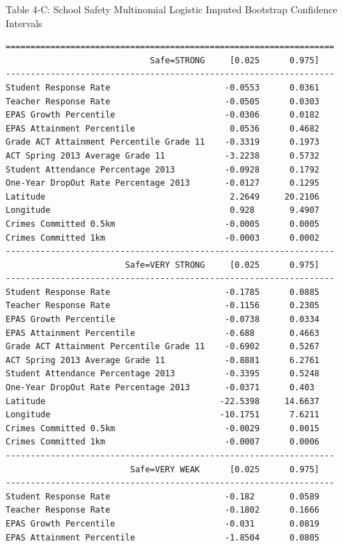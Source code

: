 \documentclass[11pt]{article}
\newcommand{\1}{\mathds{1}}
\begin{document}
\newpage
\noindent
Table 4-C: School Safety Multinomial Logistic Imputed Bootstrap Confidence Intervals
\begin{Verbatim}[fontsize=\tiny]
==================================================================
                             Safe=STRONG     [0.025      0.975]         
------------------------------------------------------------------
Student Response Rate                       -0.0553      0.0361     
Teacher Response Rate                       -0.0505      0.0303     
EPAS Growth Percentile                      -0.0306      0.0182
EPAS Attainment Percentile                   0.0536      0.4682
Grade ACT Attainment Percentile Grade 11    -0.3319      0.1973
ACT Spring 2013 Average Grade 11            -3.2238      0.5732
Student Attendance Percentage 2013          -0.0928      0.1792
One-Year DropOut Rate Percentage 2013       -0.0127      0.1295 
Latitude                                     2.2649     20.2106
Longitude                                    0.928       9.4907
Crimes Committed 0.5km                      -0.0005      0.0005
Crimes Committed 1km                        -0.0003      0.0002
------------------------------------------------------------------
                        Safe=VERY STRONG     [0.025      0.975]         
------------------------------------------------------------------
Student Response Rate                       -0.1785      0.0885
Teacher Response Rate                       -0.1156      0.2305
EPAS Growth Percentile                      -0.0738      0.0334
EPAS Attainment Percentile                  -0.688       0.4663
Grade ACT Attainment Percentile Grade 11    -0.6902      0.5267
ACT Spring 2013 Average Grade 11            -0.8881      6.2761 
Student Attendance Percentage 2013          -0.3395      0.5248 
One-Year DropOut Rate Percentage 2013       -0.0371      0.403  
Latitude                                   -22.5398     14.6637
Longitude                                  -10.1751      7.6211
Crimes Committed 0.5km                      -0.0029      0.0015
Crimes Committed 1km                        -0.0007      0.0006
------------------------------------------------------------------
                         Safe=VERY WEAK      [0.025      0.975]         
------------------------------------------------------------------
Student Response Rate                       -0.182       0.0589
Teacher Response Rate                       -0.1802      0.1666
EPAS Growth Percentile                      -0.031       0.0819
EPAS Attainment Percentile                  -1.8504      0.0805

\end{Verbatim}
\end{document}

